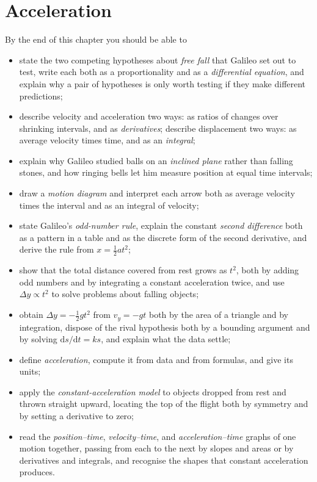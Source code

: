 \documentclass[11pt,twoside,openany]{book}
\newcommand{\dd}{\mathrm{d}}
\begin{document}
\setcounter{chapter}{1}

\chapter{Acceleration}

\begin{tcolorbox}[enhanced,colback=white,colframe=teal,sharp corners,boxrule=1pt,
  title=\textbf{In this chapter},coltitle=white,colbacktitle=teal,left=3mm,right=3mm]
By the end of this chapter you should be able to
\begin{itemize}[itemsep=2pt,topsep=2pt]
  \item state the two competing hypotheses about \emph{free fall} that Galileo set out to test, write each both as a proportionality and as a \emph{differential equation}, and explain why a pair of hypotheses is only worth testing if they make different predictions;
  \item describe velocity and acceleration two ways: as ratios of changes over shrinking intervals, and as \emph{derivatives}; describe displacement two ways: as average velocity times time, and as an \emph{integral};
  \item explain why Galileo studied balls on an \emph{inclined plane} rather than falling stones, and how ringing bells let him measure position at equal time intervals;
  \item draw a \emph{motion diagram} and interpret each arrow both as average velocity times the interval and as an integral of velocity;
  \item state Galileo's \emph{odd-number rule}, explain the constant \emph{second difference} both as a pattern in a table and as the discrete form of the second derivative, and derive the rule from $x = \tfrac12 a t^2$;
  \item show that the total distance covered from rest grows as $t^2$, both by adding odd numbers and by integrating a constant acceleration twice, and use $\Delta y \propto t^2$ to solve problems about falling objects;
  \item obtain $\Delta y = -\tfrac12 g t^2$ from $v_y = -g t$ both by the area of a triangle and by integration, dispose of the rival hypothesis both by a bounding argument and by solving $\dd s/\dd t = k s$, and explain what the data settle;
  \item define \emph{acceleration}, compute it from data and from formulas, and give its units;
  \item apply the \emph{constant-acceleration model} to objects dropped from rest and thrown straight upward, locating the top of the flight both by symmetry and by setting a derivative to zero;
  \item read the \emph{position--time}, \emph{velocity--time}, and \emph{acceleration--time} graphs of one motion together, passing from each to the next by slopes and areas or by derivatives and integrals, and recognise the shapes that constant acceleration produces.
\end{itemize}
\end{tcolorbox}
\end{document}
